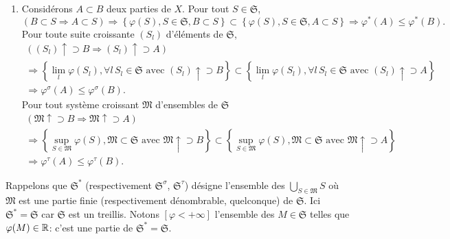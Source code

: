 \begin{demo}
\begin{enumerate}
  \item Considérons $A \subset B$ deux parties de $X$.
    Pour tout $S \in \mathfrak{S}$,
\begin{displaymath}
 \left( B \subset S \Rightarrow A \subset S \right)
   \Rightarrow
   \left\lbrace \varphi(S), S \in \mathfrak{S}, B \subset S\right\rbrace \subset \left\lbrace \varphi(S), S \in \mathfrak{S}, A \subset S\right\rbrace
   \Rightarrow
   \varphi^*(A) \leq \varphi^*(B).
\end{displaymath}
    Pour toute suite croissante $(S_l)$ d'éléments de $\mathfrak{S}$,
\begin{multline*}
 \left( (S_l)\uparrow \supset B \Rightarrow (S_l) \uparrow \supset A \right) \\
   \Rightarrow
   \left\lbrace \lim_l\varphi(S_l), \forall l\, S_l \in \mathfrak{S} \text{ avec } (S_l)\uparrow \supset B\right\rbrace
     \subset
  \left\lbrace \lim_l\varphi(S_l), \forall l\, S_l \in \mathfrak{S} \text{ avec } (S_l)\uparrow \supset A\right\rbrace \\
   \Rightarrow
   \varphi^\sigma(A) \leq \varphi^\sigma(B).
\end{multline*}
    Pour tout système croissant $\mathfrak{M}$ d'ensembles de $\mathfrak{S}$
\begin{multline*}
 \left( \mathfrak{M}\uparrow \supset B \Rightarrow \mathfrak{M} \uparrow \supset A \right) \\
   \Rightarrow
   \left\lbrace \sup_{S \in \mathfrak{M}}\varphi(S), \mathfrak{M} \subset \mathfrak{S} \text{ avec } \mathfrak{M}\uparrow \supset B\right\rbrace
     \subset
  \left\lbrace \sup_{S \in \mathfrak{M}}\varphi(S), \mathfrak{M} \subset \mathfrak{S} \text{ avec } \mathfrak{M}\uparrow \supset A\right\rbrace \\
   \Rightarrow
   \varphi^\tau(A) \leq \varphi^\tau(B).
\end{multline*}
 \end{enumerate}
\end{demo}
\noindent Rappelons que $\mathfrak{S}^{*}$ (respectivement $\mathfrak{S}^{\sigma}$, $\mathfrak{S}^{\tau}$) désigne l'ensemble des $\bigcup_{S \in \mathfrak{M}}S$ où $\mathfrak{M}$ est une partie finie (respectivement dénombrable, quelconque) de $\mathfrak{S}$. Ici  $\mathfrak{S}^{*} = \mathfrak{S}$ car  $\mathfrak{S}$ est un treillis.\newline
Notons $[\varphi < +\infty]$ l'ensemble des $M \in \mathfrak{S}$ telles que $\varphi(M) \in \mathbb{R}$: c'est une partie de $\mathfrak{S}^{*} = \mathfrak{S}$.\newline
